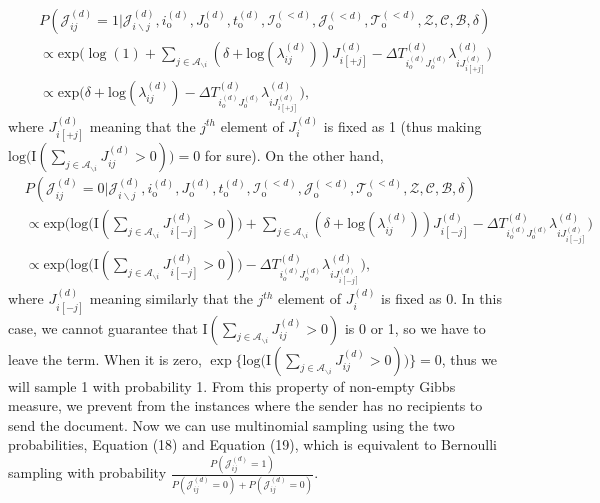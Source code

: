 \documentclass[a4paper]{article}
\begin{document}
       \begin{equation}
       \begin{aligned}
       &P(\mathcal{J}^{(d)}_{ij}=1| \mathcal{J}^{(d)}_{i\backslash j}, i^{(d)}_{\mbox{o}}, J^{(d)}_{\mbox{o}}, t^{(d)}_{\mbox{o}}, \mathcal{I}^{(<d)}_{\mbox{o}}, \mathcal{J}^{(<d)}_{\mbox{o}}, \mathcal{T}^{(<d)}_{\mbox{o}}, \mathcal{Z}, \mathcal{C}, \mathcal{B}, \delta)\\& \propto \mbox{exp}\Big(\log(1) +\sum_{j \in \mathcal{A}_{\backslash i}} ( \delta+\mbox{log}(\lambda_{ij}^{(d)}))J_{i[+j]}^{(d)} -\Delta T^{(d)}_{i_o^{(d)}J_o^{(d)}}\lambda^{(d)}_{iJ^{(d)}_{ i[+j]}}\Big)
       \\& \propto \mbox{exp}\Big(\delta+\mbox{log}(\lambda_{ij}^{(d)})-\Delta T^{(d)}_{i_o^{(d)}J_o^{(d)}}\lambda^{(d)}_{iJ^{(d)}_{ i[+j]}}\Big),
       \end{aligned}
       \end{equation}
       where $J^{(d)}_{i[+j]}$ meaning that the $j^{th}$ element of $J_{i}^{(d)}$ is fixed as 1 (thus making $\mbox{log}\big(\text{I}( \sum_{j \in \mathcal{A}_{\backslash i}} J^{(d)}_{ij} > 0 )\big) = 0$ for sure). On the other hand, 
       \begin{equation}
       \begin{aligned}
       &P(\mathcal{J}^{(d)}_{ij}=0| \mathcal{J}^{(d)}_{i\backslash j}, i^{(d)}_{\mbox{o}}, J^{(d)}_{\mbox{o}}, t^{(d)}_{\mbox{o}}, \mathcal{I}^{(<d)}_{\mbox{o}}, \mathcal{J}^{(<d)}_{\mbox{o}}, \mathcal{T}^{(<d)}_{\mbox{o}}, \mathcal{Z}, \mathcal{C}, \mathcal{B}, \delta)\\& \propto \mbox{exp}\Big(\mbox{log}\big(\text{I}( \sum_{j \in \mathcal{A}_{\backslash i}} J^{(d)}_{i[-j]} > 0 )\big) + \sum_{j \in \mathcal{A}_{\backslash i}} (\delta+\mbox{log}(\lambda_{ij}^{(d)}))J_{i[-j]}^{(d)} -\Delta T^{(d)}_{i_o^{(d)}J_o^{(d)}}\lambda^{(d)}_{iJ^{(d)}_{ i[-j]}}\Big)
       \\& \propto \mbox{exp}\Big(\mbox{log}\big(\text{I}( \sum_{j \in \mathcal{A}_{\backslash i}} J^{(d)}_{i[-j]} > 0 )\big) -\Delta T^{(d)}_{i_o^{(d)}J_o^{(d)}}\lambda^{(d)}_{iJ^{(d)}_{ i[-j]}}\Big),
       \end{aligned}
       \end{equation}
       where $J^{(d)}_{i[-j]}$ meaning similarly that the $j^{th}$ element of $J_{i}^{(d)}$ is fixed as 0. In this case, we cannot guarantee that $\text{I}( \sum_{j \in \mathcal{A}_{\backslash i}} J^{(d)}_{ij} > 0)$ is 0 or 1, so we have to leave the term. When it is zero, $\exp\{\mbox{log}\big(\text{I}( \sum_{j \in \mathcal{A}_{\backslash i}} J^{(d)}_{ij} > 0 )\big)\} = 0$, thus we will sample 1 with probability 1. From this property of non-empty Gibbs measure, we prevent from the instances where the sender has no recipients to send the document. Now we can use multinomial sampling using the two probabilities, Equation (18) and Equation (19), which is equivalent to Bernoulli sampling with probability $\frac{P(\mathcal{J}^{(d)}_{ij}=1)}{P(\mathcal{J}^{(d)}_{ij}=0)+ P(\mathcal{J}^{(d)}_{ij}=0)}$. 
\end{document}
